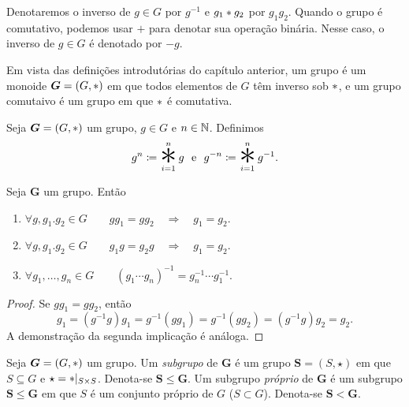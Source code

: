 \begin{nota}
Denotaremos o inverso de $g \in G$ por $g^{-1}$ e $g_1 \ast g_2$ por $g_1g_2$. Quando o grupo é comutativo, podemos usar $+$ para denotar sua operação binária. Nesse caso, o inverso de $g \in G$ é denotado por $-g$.
\end{nota}

Em vista das definições introdutórias do capítulo anterior, um grupo é um monoide $\bm G=(G,\ast)$ em que todos elementos de $G$ têm inverso sob $\ast$, e um grupo comutaivo é um grupo em que $\ast$ é comutativa.

\begin{defi}
Seja $\bm G=(G,\ast)$ um grupo, $g \in G$ e $n \in \mathbb{N}$. Definimos
	\begin{equation*}
	g^n \coloneqq \bigopb_{i=1}^n g \e g^{-n} \coloneqq \bigopb_{i=1}^n g^{-1}.
	\end{equation*}
\end{defi}

\begin{prop}
	Seja $\bm G$ um grupo. Então
	\begin{enumerate}
	\item $\forall g,g_1.g_2 \in G \qquad gg_1 = gg_2 \quad \Rightarrow \quad g_1 = g_2$.
	\item $\forall g,g_1.g_2 \in G \qquad g_1g = g_2g \quad \Rightarrow \quad g_1 = g_2$.
	\item $\forall g_1,\ldots,g_n \in G \qquad (g_1 \cdots g_n)^{-1}=g_n^{-1} \cdots g_1^{-1}.$
	\end{enumerate}
\end{prop}
\begin{proof}
	Se $g g_1 = g g_2$, então
	\begin{equation*}
	g_1 = (g^{-1}g)g_1 = g^{-1}(gg_1) = g^{-1}(gg_2) = (g^{-1}g)g_2 = g_2.
	\end{equation*}
A demonstração da segunda implicação é análoga.
\end{proof}

\begin{defi}
Seja $\bm G=(G,\ast)$ um grupo. Um \emph{subgrupo} de $\bm G$ é um grupo $\bm S=(S,\star)$ em que $S \subseteq G$ e $\star=\ast|_{S \times S}$. Denota-se $\bm S \leq \bm G$. Um subgrupo \emph{próprio} de $\bm G$ é um subgrupo $\bm S \leq \bm G$ em que $S$ é um conjunto próprio de $G$ ($S  \subset G$). Denota-se $\bm S < \bm G$.
\end{defi}

